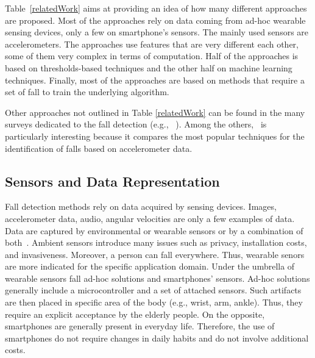 \documentclass[twocolumn]{svjour3}          \smartqed  \usepackage[draft]{hyperref}
\begin{document}


Table~\ref{relatedWork} aims at providing  an idea of how many different approaches are proposed. Most of the approaches rely on data coming from ad-hoc wearable sensing devices, only a few on smartphone's sensors. The mainly used sensors are accelerometers. The approaches use features that are very different each other, some of them very complex in terms of computation. Half of the approaches is based on thresholds-based techniques and the other half on machine learning techniques. Finally, most of the approaches are based on methods that require a set of fall to train the underlying algorithm.

Other approaches not outlined in Table \ref{relatedWork} can be found in the many surveys dedicated to the fall detection (e.g., ~\citet{mubashir_survey_2013,mohamed_fall_2014,hijaz_survey_2010}). Among the others,~\citet{bagala_evaluation_2012} is particularly interesting because it compares the most popular techniques for the identification of falls based on accelerometer data.

\subsection{Sensors and Data Representation}
Fall detection methods rely on data acquired by sensing devices. Images, accelerometer data, audio, angular velocities are only a few examples of data. Data are captured by environmental or wearable sensors or by a combination of both~\citep{mubashir_survey_2013,liming_chen_sensor-based_2012}.
Ambient sensors introduce many issues such as privacy, installation costs, and invasiveness. Moreover, a person can fall everywhere. Thus, wearable senors are more indicated for the specific application domain. Under the umbrella of wearable sensors fall ad-hoc solutions and smartphones' sensors. Ad-hoc solutions generally include a microcontroller and a set of attached sensors. Such artifacts are then placed in specific area of the body (e.g., wrist, arm, ankle). Thus, they require an explicit acceptance by the elderly people. On the opposite, smartphones are generally present in everyday life. Therefore, the use of smartphones do not require changes in daily habits and do not involve additional costs.
\end{document}
